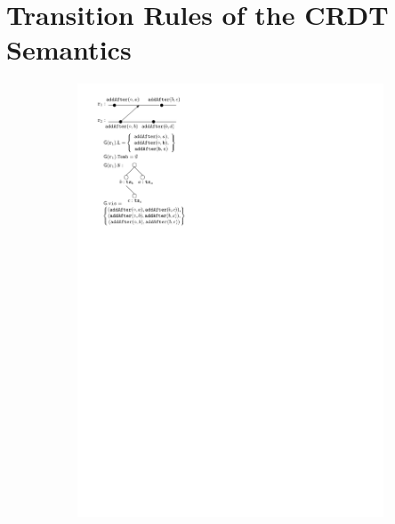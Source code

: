 \section{Transition Rules of the CRDT Semantics}

\begin{figure}[t]
  \begin{subfigure}[!ht]{.3\linewidth}
    \includegraphics[scale=.7]{figures/LinRGA-1}
      \vspace{1.3cm}
    \caption{}
    \label{fig:rga-sem-1}
  \end{subfigure}
  \begin{subfigure}[!ht]{.3\linewidth}

\end{subfigure}
\end{figure}
